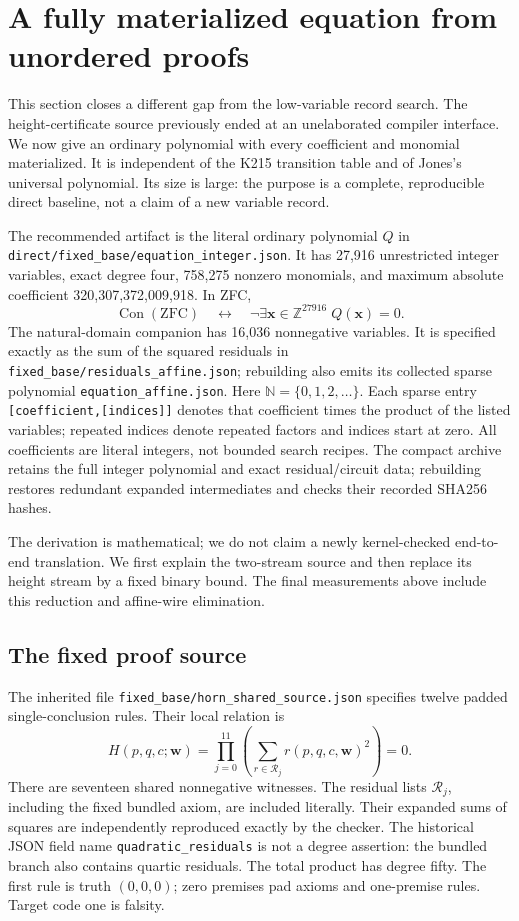 \section{A fully materialized equation from unordered proofs}
\label{sec:direct-materialized}

This section closes a different gap from the low-variable record search.
The height-certificate source previously ended at an unelaborated compiler
interface. We now give an ordinary polynomial with every coefficient and
monomial materialized. It is independent of the K215 transition table and
of Jones's universal polynomial. Its size is large: the purpose is a
complete, reproducible direct baseline, not a claim of a new variable record.

The recommended artifact is the literal ordinary polynomial $Q$ in
\texttt{direct/fixed\_base/equation\_integer.json}. It has 27,916 unrestricted
integer variables, exact degree four, 758,275 nonzero monomials, and
maximum absolute coefficient 320,307,372,009,918. In ZFC,
\[
 \operatorname{Con}(\mathrm{ZFC})\quad\longleftrightarrow\quad
 \neg\exists\boldsymbol{x}\in\mathbb Z^{27916}\;Q(\boldsymbol{x})=0.
\]
The natural-domain companion has 16,036 nonnegative variables. It is
specified exactly as the sum of the squared residuals in
\texttt{fixed\_base/residuals\_affine.json}; rebuilding also emits its
collected sparse polynomial \texttt{equation\_affine.json}. Here
$\mathbb N=\{0,1,2,\ldots\}$. Each sparse entry
\texttt{[coefficient,[indices]]} denotes that coefficient times the product
of the listed variables; repeated indices denote repeated factors and
indices start at zero. All coefficients are literal integers, not bounded
search recipes. The compact archive retains the full integer polynomial
and exact residual/circuit data; rebuilding restores redundant expanded
intermediates and checks their recorded SHA256 hashes.

The derivation is mathematical; we do not claim a newly kernel-checked
end-to-end translation. We first explain the two-stream source and then
replace its height stream by a fixed binary bound. The final measurements
above include this reduction and affine-wire elimination.

\subsection{The fixed proof source}

The inherited file \texttt{fixed\_base/horn\_shared\_source.json} specifies twelve
padded single-conclusion rules. Their local relation is
\[
 H(p,q,c;\boldsymbol w)=\prod_{j=0}^{11}
             \left(\sum_{r\in\mathcal R_j}r(p,q,c,\boldsymbol w)^2\right)=0.
\]
There are seventeen shared nonnegative witnesses. The residual lists
$\mathcal R_j$, including the fixed bundled axiom, are included literally.
Their expanded sums of squares are independently reproduced exactly by
the checker. The historical JSON field name
\texttt{quadratic\_residuals} is not a degree assertion: the bundled branch
also contains quartic residuals. The total product has degree fifty.
The first rule is truth $(0,0,0)$; zero premises pad axioms and one-premise
rules. Target code one is falsity.

